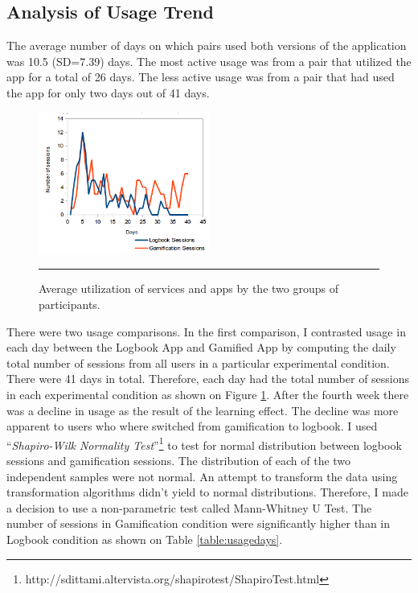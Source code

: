 \subsection{Analysis of Usage Trend}
The average number of days on which pairs used both versions of the application was 10.5 (SD=7.39) days. The most active usage was from a pair that utilized the app for a total of 26 days. The less active usage was from a pair that had used the app for only two days out of 41 days.
\begin{figure}[htbp]
  \centering
    \includegraphics[width=0.5\textwidth]{Figures/scatter_daily_sessions.png}
    \rule{35em}{0.5pt}
  \caption{Average utilization of services and apps by the two groups of participants.}
  \label{figure:usagedailysessions}
\end{figure}\newline
There were two usage comparisons. In the first comparison, I contrasted usage in each day between the Logbook App and Gamified App by computing the daily total number of sessions from all users in a particular experimental condition. There were 41 days in total. Therefore, each day had the total number of sessions in each experimental condition as shown on Figure \ref{figure:usagedailysessions}. After the fourth week there was a decline in usage as the result of the learning effect. The decline was more apparent to users who where switched from gamification to logbook. I used ``\emph{Shapiro-Wilk Normality Test}''\footnote{http://sdittami.altervista.org/shapirotest/ShapiroTest.html} to test for normal distribution between logbook sessions and gamification sessions. The distribution of each of the two independent samples were not normal. An attempt to transform the data using transformation algorithms didn't yield to normal distributions. Therefore, I made a decision to use a non-parametric test called Mann-Whitney U Test. The number of sessions in Gamification condition were significantly higher than in Logbook condition as shown on Table \ref{table:usagedays}.
